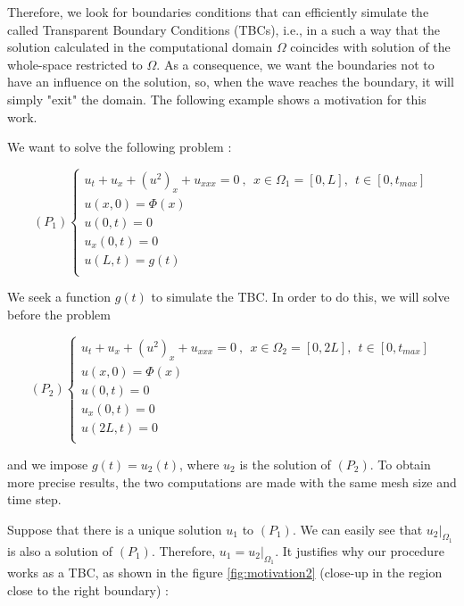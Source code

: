 \indent Therefore, we look for boundaries conditions that can efficiently simulate the called Transparent Boundary Conditions (TBCs), i.e., in a such a way that the solution calculated in the computational domain $\Omega$ coincides with solution of the whole-space restricted to $\Omega$. As a consequence, we want the boundaries not to have an influence on the solution, so, when the wave reaches the boundary, it will simply "exit" the domain. The following example shows a motivation for this work.

\indent We want to solve the following problem :

\begin{equation}
    (P_1) \begin{cases}
    u_t + u_x + (u^2)_x + u_{xxx} = 0 \ , \ \ x \in \Omega_1 = [0,L], \ \ t \in [0, t_{max}] \\
    u(x,0) = \Phi(x) \\
    u(0,t) = 0 \\
    u_x(0,t) = 0 \\
    u(L,t) = g(t)  \\ 
    \end{cases}
\end{equation}

\indent We seek a function $g(t)$ to simulate the TBC. In order to do this, we will solve before the problem

\begin{equation}
    (P_2) \begin{cases}
    u_t + u_x + (u^2)_x + u_{xxx} = 0 \ , \ \ x \in \Omega_2 = [0,2L], \ \ t \in [0, t_{max}] \\
    u(x,0) = \Phi(x) \\
    u(0,t) = 0 \\
    u_x(0,t) = 0 \\
    u(2L,t) = 0  \\ 
    \end{cases}
\end{equation}

\noindent and we impose $g(t) = u_2(t)$, where $u_2$ is the solution of $(P_2)$. To obtain more precise results, the two computations are made with the same mesh size and time step.

\noindent Suppose that there is a unique solution $u_1$ to $(P_1)$. We can easily see that $u_2|_{\Omega_1}$ is also a solution of $(P_1)$. Therefore, $u_1 = u_2|_{\Omega_1}$. It justifies why our procedure works as a TBC, as shown in the figure \ref{fig:motivation2} (close-up in the region close to the right boundary) :

